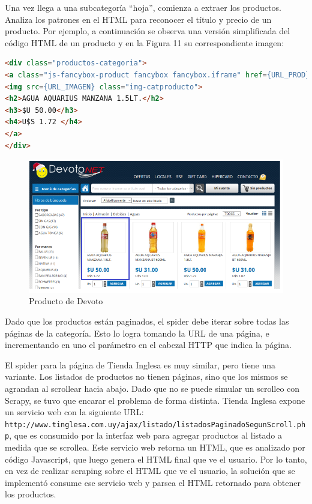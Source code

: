 \documentclass[12pt]{article} %
\begin{document}
Una vez llega a una subcategoría “hoja”, comienza a extraer los productos. Analiza los patrones en el HTML para reconocer el título y precio de un producto. Por ejemplo, a continuación se observa una versión simplificada del código HTML de un producto y en la Figura 11 su correspondiente imagen:


\begin{lstlisting}[language=HTML]
<div class="productos-categoria">
<a class="js-fancybox-product fancybox fancybox.iframe" href={URL_PROD}>
<img src={URL_IMAGEN} class="img-catproducto">
<h2>AGUA AQUARIUS MANZANA 1.5LT.</h2>
<h3>$U 50.00</h3>
<h4>U$S 1.72 </h4>
</a>
</div>
\end{lstlisting}

\begin{figure}[H]
\includegraphics[height=0.30\textwidth]{producto_devoto}
\centering
\caption{Producto de Devoto}
\end{figure}


Dado que los productos están paginados, el spider debe iterar sobre todas las páginas de la categoría. Esto lo logra tomando la URL de una página, e incrementando en uno el parámetro en el cabezal HTTP que indica la página.

El spider para la página de Tienda Inglesa es muy similar, pero tiene una variante. Los listados de productos no tienen páginas, sino que los mismos se agrandan al scrollear hacia abajo. Dado que no se puede simular un scrolleo con Scrapy, se tuvo que encarar el problema de forma distinta. Tienda Inglesa expone un servicio web con la siguiente URL: \texttt{http://www.tinglesa.com.uy/ajax/listado/listadosPaginadoSegunScroll.php}, que es consumido por la interfaz web para agregar productos al listado a medida que se scrollea. Este servicio web retorna un HTML, que es analizado por código Javascript, que luego genera el HTML final que ve el usuario. Por lo tanto, en vez de realizar scraping sobre el HTML que ve el usuario, la solución que se implementó consume ese servicio web y parsea el HTML retornado para obtener los productos.

\end{document}
